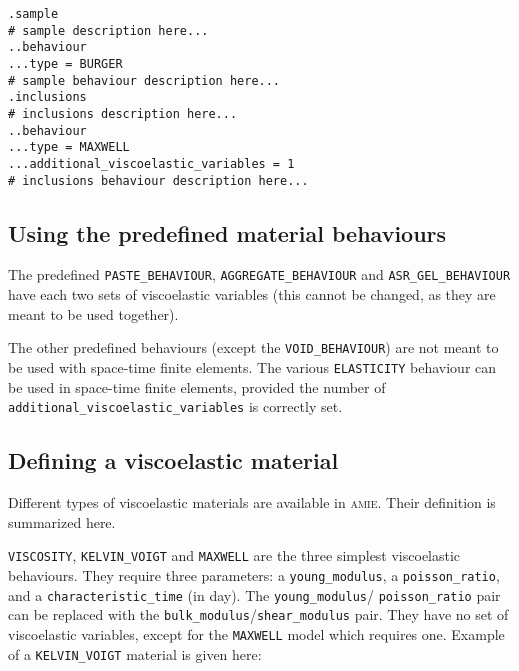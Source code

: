 \documentclass[10pt]{article}
\begin{document}
\noindent \verb+.sample+\\
\verb+# sample description here...+\\
\verb+..behaviour+\\
\verb+...type = BURGER+\\
\verb+# sample behaviour description here...+\\
\verb+.inclusions+\\
\verb+# inclusions description here...+\\
\verb+..behaviour+\\
\verb+...type = MAXWELL+\\
\verb+...additional_viscoelastic_variables = 1+\\
\verb+# inclusions behaviour description here...+

\subsection{Using the predefined material behaviours}

The predefined \verb+PASTE_BEHAVIOUR+, \verb+AGGREGATE_BEHAVIOUR+ and \verb+ASR_GEL_BEHAVIOUR+ have each two sets of viscoelastic variables (this cannot be changed, as they are meant to be used together). 

The other predefined behaviours (except the \verb+VOID_BEHAVIOUR+) are not meant to be used with space-time finite elements. The various \verb+ELASTICITY+ behaviour can be used in space-time finite elements, provided the number of \verb+additional_viscoelastic_variables+ is correctly set.

\subsection{Defining a viscoelastic material}

Different types of viscoelastic materials are available in \textsc{amie}. Their definition is summarized here.

\verb+VISCOSITY+, \verb+KELVIN_VOIGT+ and \verb+MAXWELL+ are the three simplest viscoelastic behaviours. They require three parameters: a \verb+young_modulus+, a \verb+poisson_ratio+, and a \verb+characteristic_time+ (in day). The \verb+young_modulus+/ \verb+poisson_ratio+ pair can be replaced with the \verb+bulk_modulus+/\verb+shear_modulus+ pair. They have no set of viscoelastic variables, except for the \verb+MAXWELL+ model which requires one. Example of a \verb+KELVIN_VOIGT+ material is given here:\\
\end{document}
